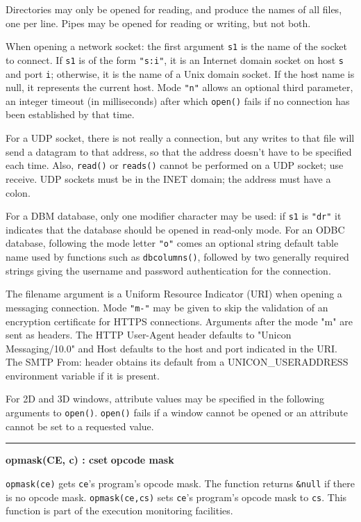 Directories may only be opened for reading, and produce the names of all
files, one per line. Pipes may be opened for reading or writing, but
not both.

When opening a network socket: the first argument \texttt{s1} is the
name of the socket to connect. If \texttt{s1} is of the form
\texttt{"s:i"}, it is an Internet domain socket on
host \texttt{s} and port \texttt{i}; otherwise, it is the name of a Unix
domain socket. If the host name is null, it represents the current
host. Mode \texttt{"n"} allows an optional third parameter,
an integer timeout (in milliseconds) after which \texttt{open()} fails
if no connection has been established by that time.

For a UDP socket, there is not really a connection, but any writes to
that file will send a datagram to that address, so that the address
doesn't have to be specified each time. Also,
\texttt{read()} or \texttt{reads()} cannot be performed on a UDP
socket; use receive. UDP sockets must be in the INET domain; the
address must have a colon. 

For a DBM database, only one modifier character may be used: if
\texttt{s1} is \texttt{"dr"} it indicates that the database should be
opened in read-only mode.  For an ODBC database, following the mode
letter \texttt{"o"} comes an optional string default table name used
by functions such as \texttt{dbcolumns()}, followed by two generally
required strings giving the username and password authentication for the
connection.

The filename argument is a Uniform Resource Indicator (URI) when opening
a messaging connection. Mode \texttt{"m-"} may be given to skip the
validation of an encryption certificate for HTTPS connections.
Arguments after the mode "m" are sent as headers. The HTTP
User-Agent header defaults to "Unicon
Messaging/10.0" and Host defaults to the host and port
indicated in the URI. The SMTP From: header obtains its default from a
UNICON\_USERADDRESS environment variable if it is present.

For 2D and 3D windows, attribute values may be specified in the
following arguments to \texttt{open()}. \texttt{open()} fails if a
window cannot be opened or an attribute cannot be set to a requested
value.

\bigskip\hrule\vspace{0.1cm}
\noindent
{\bf opmask(CE, c) : cset } \hfill {\bf opcode mask}

\noindent
\texttt{opmask(ce)} gets \texttt{ce}'s
program's opcode mask. The function returns
\texttt{\&null} if there is no opcode mask. \texttt{opmask(ce,cs)} sets
\texttt{ce}'s program's opcode mask
to \texttt{cs}. This function is part of the execution monitoring
facilities.

